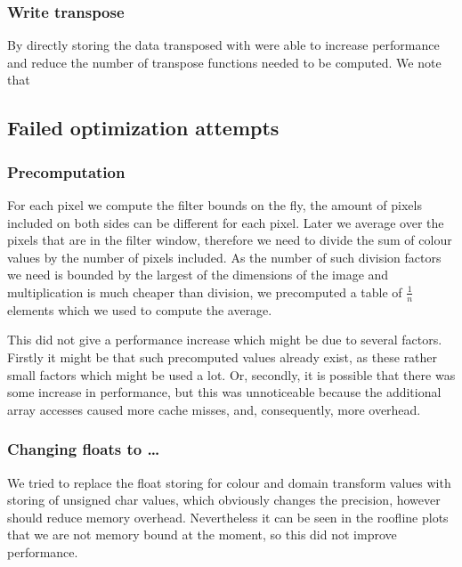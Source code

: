 \subsubsection{Write transpose}
By directly storing the data transposed with were able to increase performance and reduce the number of transpose functions needed to be computed. We note that 

\subsection{Failed optimization attempts}

\subsubsection{Precomputation} 

For each pixel we compute the filter bounds on the fly, the amount of pixels included on both sides can be different for each pixel. Later we average over the pixels that are in the filter window, therefore we need to divide the sum of colour values by the number of pixels included. As the number of such division factors we need is bounded by the largest of the dimensions of the image and multiplication is much cheaper than division, we precomputed a table of $\frac{1}{n}$ elements which we used to compute the average.

This did not give a performance increase which might be due to several factors. Firstly it might be that such precomputed values already exist, as these rather small factors which might be used a lot. Or, secondly, it is possible that there was some increase in performance, but this was unnoticeable because the additional array accesses caused more cache misses, and, consequently, more overhead.

\subsubsection{Changing floats to \dots}


We tried to replace the float storing for colour and domain transform values with storing of unsigned char values, which obviously changes the precision, however should reduce memory overhead. Nevertheless it can be seen in the roofline plots that we are not memory bound at the moment, so this did not improve performance.


